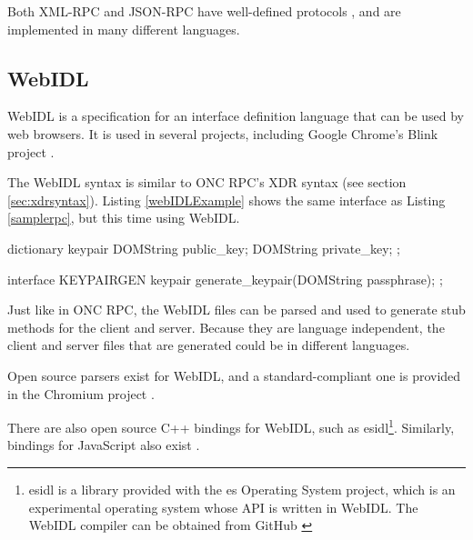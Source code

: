 Both XML-RPC and JSON-RPC have well-defined protocols \cite{jsonrpcspec}\cite{xmlrpcspec}, and are implemented in many different languages.

\subsection{WebIDL} %
\label{sub:webidl_intro}
WebIDL is a specification \cite{webidlw3c} for an interface definition language that can be used by web browsers. It is used in several projects, including Google Chrome's Blink project \cite{blinkwebidl}.

The WebIDL syntax is similar to ONC RPC's XDR syntax (see section \ref{sec:xdrsyntax}). Listing \ref{webIDLExample} shows the same interface as Listing \ref{samplerpc}, but this time using WebIDL.

\begin{code}
dictionary keypair {
  DOMString public_key;
  DOMString private_key;
};

interface KEYPAIRGEN {
  keypair generate_keypair(DOMString passphrase);
};
\end{code}

Just like in ONC RPC, the WebIDL files can be parsed and used to generate stub methods for the client and server. Because they are language independent, the client and server files that are generated could be in different languages. 

Open source parsers exist for WebIDL, and a standard-compliant one is provided in the Chromium project \cite{chromiumwebidlparser}. 

There are also open source C++ bindings for WebIDL, such as esidl\footnote{esidl is a library provided with the es Operating System project, which is an experimental operating system whose API is written in WebIDL. The WebIDL compiler can be obtained from GitHub \cite{esidlproject}}. Similarly, bindings for JavaScript also exist \cite{webidljsimplementation}. 



